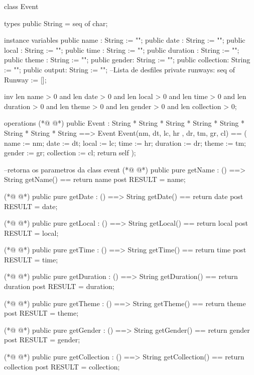 \begin{vdmpp}[breaklines=true]
class Event
 
types
 public String = seq of char; 

instance variables
 public  name : String := "";
 public  date : String := "";
 public  local : String := "";
 public  time : String := "";
 public  duration : String := "";
 public  theme : String := "";
 public  gender: String := "";
 public  collection: String := "";
 public  output: String := "";
 --Lista de desfiles
 private runways: seq of Runway := [];
 
 inv len name > 0 and len date > 0 and len local > 0 and len time > 0 and len duration > 0 and 
   len theme > 0 and len gender > 0 and len collection > 0;
 
 
operations
(*@
\label{Event:24}
@*)
 public Event : 
         String * 
         String *
         String *
         String *
         String *
         String *
         String *  
         String ==> Event
 Event(nm, dt, lc, hr , dr, tm, gr, cl) == (
  name := nm;
  date := dt;
  local := lc;
  time := hr;
  duration := dr;
  theme := tm;
  gender := gr;
  collection := cl;
  return self
 );
 
 --retorna os parametros da class event
(*@
\label{getName:46}
@*)
  public pure getName : () ==> String
    getName() == return name
    post RESULT = name;
    
(*@
\label{getDate:50}
@*)
   public pure getDate : () ==> String
     getDate() == return date
  post RESULT = date;
     
(*@
\label{getLocal:54}
@*)
  public pure getLocal : () ==> String
     getLocal() == return local
  post RESULT = local;
     
(*@
\label{getTime:58}
@*)
  public pure getTime : () ==> String
     getTime() == return time    
  post RESULT = time;
     
(*@
\label{getDuration:62}
@*)
  public pure getDuration : () ==> String
     getDuration() == return duration
  post RESULT = duration;
     
(*@
\label{getTheme:66}
@*)
  public pure getTheme : () ==> String
     getTheme() == return theme
  post RESULT = theme;
    
(*@
\label{getGender:70}
@*)
  public pure getGender : () ==> String
     getGender() == return gender
  post RESULT = gender;
     
(*@
\label{getCollection:74}
@*)
  public pure getCollection : () ==> String
     getCollection() == return collection
  post RESULT = collection;
  

\end{vdmpp}

